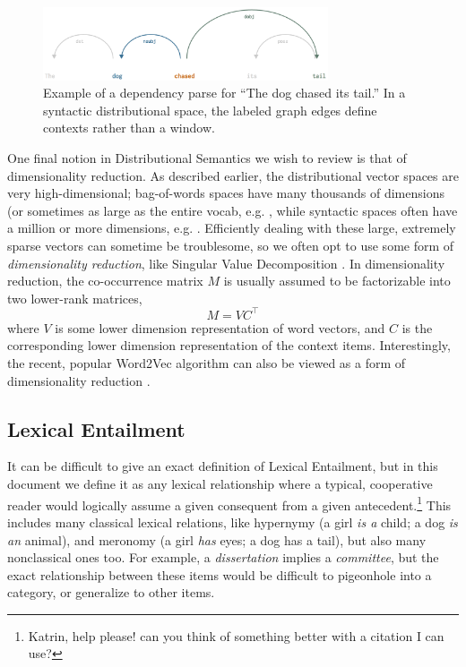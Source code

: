 \documentclass[letterpaper]{article}
\begin{document}
\begin{figure}
  \centering
  \includegraphics[width=0.75\textwidth]{figures/syn}
\caption{Example of a dependency parse for ``The dog chased its tail.'' In
a syntactic distributional space, the labeled graph edges define contexts
rather than a window.}
\label{fig:syn}
\end{figure}

One final notion in Distributional Semantics we wish to review is that of
dimensionality reduction. As described earlier, the distributional vector
spaces are very high-dimensional; bag-of-words spaces have many thousands of
dimensions (or sometimes as large as the entire vocab, e.g.
, while syntactic spaces often have a million
or more dimensions, e.g. . Efficiently dealing
with these large, extremely sparse vectors can sometime be troublesome, so
we often opt to use some form of {\em dimensionality reduction}, like
Singular Value Decomposition \cite{landauer:1997:pr}. In dimensionality
reduction, the co-occurrence matrix $M$ is usually assumed to be factorizable
into two lower-rank matrices,
\begin{equation*}
  M = VC^{\top}
\end{equation*}
where $V$ is some lower dimension representation of word vectors, and $C$
is the corresponding lower dimension representation of the context items.
Interestingly, the recent, popular Word2Vec algorithm \cite{mikolov:2013:iclr}
can also be viewed as a form of dimensionality reduction \cite{levy:2014:nips}.

\subsection{Lexical Entailment}

It can be difficult to give an exact definition of Lexical Entailment, but in
this document we define it as any lexical relationship where a typical,
cooperative reader would logically assume a given consequent from a given
antecedent.\footnote{Katrin, help please!  can you think of something better
with a citation I can use?} This includes many classical lexical relations,
like hypernymy (a girl {\em is a} child; a dog {\em is an} animal), and
meronomy (a girl {\em has} eyes; a dog {has a} tail), but also many
nonclassical ones too. For example, a {\em dissertation} implies a {\em
committee}, but the exact relationship between these items would be difficult
to pigeonhole into a category, or generalize to other items.
\end{document}
